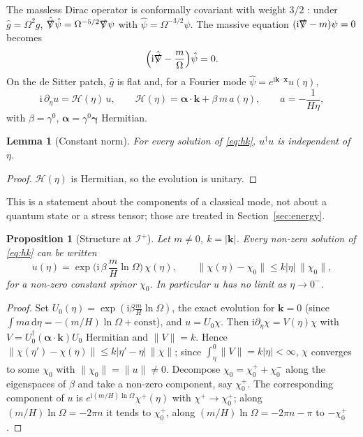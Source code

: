 \documentclass[11pt,a4paper]{article}
\newtheorem{proposition}{Proposition}
\newtheorem{lemma}{Lemma}
\theoremstyle{definition}
\newcommand{\scri}{\mathscr{I}^{+}}
\newcommand{\dd}{\mathrm{d}}
\newcommand{\ii}{\mathrm{i}}
\newcommand{\hg}{\hat g}
\newcommand{\hpsi}{\hat\psi}
\begin{document}
The massless Dirac operator is conformally covariant with weight $3/2$ \cite{BirrellDavies,ParkerToms}: under $\hg=\Omega^{2}g$, $\hat{\slashed\nabla}\hpsi=\Omega^{-5/2}\slashed\nabla\psi$ with $\hpsi=\Omega^{-3/2}\psi$. The massive equation $(\ii\slashed\nabla-m)\psi=0$ becomes
\begin{equation}
\Big(\ii\hat{\slashed\nabla}-\frac{m}{\Omega}\Big)\hpsi=0 .
\label{eq:dirachat}
\end{equation}
On the de Sitter patch, $\hg$ is flat and, for a Fourier mode $\hpsi=e^{\ii\mathbf{k}\cdot\mathbf{x}}u(\eta)$,
\begin{equation}
\ii\,\partial_{\eta}u=\mathcal{H}(\eta)\,u,\qquad \mathcal{H}(\eta)=\boldsymbol\alpha\cdot\mathbf{k}+\beta\,m\,a(\eta),\qquad a=-\frac{1}{H\eta},
\label{eq:hk}
\end{equation}
with $\beta=\gamma^{0}$, $\boldsymbol\alpha=\gamma^{0}\boldsymbol\gamma$ Hermitian.

\begin{lemma}[Constant norm]
\label{lem:norm}
For every solution of \eqref{eq:hk}, $u^{\dagger}u$ is independent of $\eta$.
\end{lemma}
\begin{proof}
$\mathcal{H}(\eta)$ is Hermitian, so the evolution is unitary.
\end{proof}

This is a statement about the components of a classical mode, not about a quantum state or a stress tensor; those are treated in Section~\ref{sec:energy}.

\begin{proposition}[Structure at $\scri$]
\label{prop:dirac}
Let $m\neq0$, $k=|\mathbf{k}|$. Every non-zero solution of \eqref{eq:hk} can be written
\begin{equation}
u(\eta)=\exp\!\Big(\ii\,\beta\,\frac{m}{H}\ln\Omega\Big)\,\chi(\eta),\qquad \|\chi(\eta)-\chi_{0}\|\le k|\eta|\,\|\chi_{0}\|,
\label{eq:structure}
\end{equation}
for a non-zero constant spinor $\chi_{0}$. In particular $u$ has no limit as $\eta\to0^{-}$.
\end{proposition}
\begin{proof}
Set $U_{0}(\eta)=\exp(\ii\beta\frac{m}{H}\ln\Omega)$, the exact evolution for $\mathbf{k}=0$ (since $\int m a\,\dd\eta=-(m/H)\ln\Omega+\text{const}$), and $u=U_{0}\chi$. Then $\ii\partial_{\eta}\chi=V(\eta)\chi$ with $V=U_{0}^{\dagger}(\boldsymbol\alpha\cdot\mathbf{k})U_{0}$ Hermitian and $\|V\|=k$. Hence $\|\chi(\eta')-\chi(\eta)\|\le k|\eta'-\eta|\,\|\chi\|$; since $\int_{\eta}^{0}\|V\|=k|\eta|<\infty$, $\chi$ converges to some $\chi_{0}$ with $\|\chi_{0}\|=\|u\|\neq0$. Decompose $\chi_{0}=\chi_{0}^{+}+\chi_{0}^{-}$ along the eigenspaces of $\beta$ and take a non-zero component, say $\chi_{0}^{+}$. The corresponding component of $u$ is $e^{\ii(m/H)\ln\Omega}\chi^{+}(\eta)$ with $\chi^{+}\to\chi_{0}^{+}$; along $(m/H)\ln\Omega=-2\pi n$ it tends to $\chi_{0}^{+}$, along $(m/H)\ln\Omega=-2\pi n-\pi$ to $-\chi_{0}^{+}$.
\end{proof}
\end{document}
